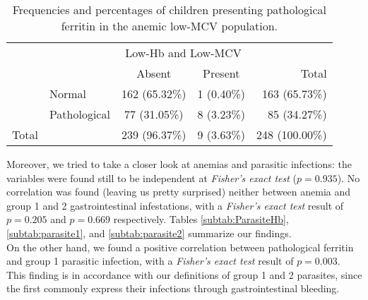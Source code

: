 \begin{table}[H]
   \centering
   \begin{tabular}{c l c c | r}
   	  & & \multicolumn{2}{c}{Low-Hb and Low-MCV} & \\
   	  \cline{3-4}
       & & Absent & Present & Total\\
      \hline
       \parbox[t]{2mm}{} & Normal & 162 (65.32\%) & 1 (0.40\%) & 163 (65.73\%)\\
       & Pathological & 77 (31.05\%) & 8 (3.23\%) & 85 (34.27\%)\\
      \hline
      Total & & 239 (96.37\%) & 9 (3.63\%) & 248 (100.00\%)\\
   \end{tabular}
   \caption{Frequencies and percentages of children presenting pathological ferritin in the anemic low-MCV population.}
    \label{tab:Ferritin_HbMCV}
\end{table}

Moreover, we tried to take a closer look at anemias and parasitic infections: the variables were found still to be independent at \textit{Fisher's exact test} ($p=0.935$). No correlation was found (leaving us pretty surprised) neither between anemia and group 1 and 2 gastrointestinal infestations, with a \textit{Fisher's exact test} result of $p=0.205$ and $p=0.669$ respectively. Tables \ref{subtab:ParasiteHb}, \ref{subtab:parasite1}, and \ref{subtab:parasite2} summarize our findings.\\
On the other hand, we found a positive correlation between pathological ferritin and group 1 parasitic infection, with a \textit{Fisher's exact test} result of $p=0.003$. This finding is in accordance with our definitions of group 1 and 2 parasites, since the first commonly express their infections through gastrointestinal bleeding.


